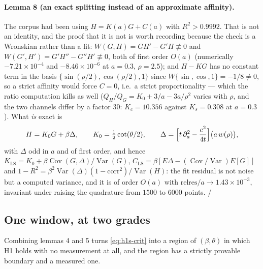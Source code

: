 \paragraph{Lemma 8 (an exact splitting instead of an approximate affinity).} The corpus had been
using $H=K(a)G+C(a)$ with $R^{2}>0.9992$. That is not an identity, and the proof that it is not is
worth recording because the check is a Wronskian rather than a fit: $W(G,H)=GH'-G'H\not\equiv0$ and
$W(G',H')=G'H''-G''H'\not\equiv0$, both of first order $O(a)$ (numerically $-7.21\times10^{-4}$ and
$-8.46\times10^{-6}$ at $a=0.3$, $\rho=2.5$); and $H-KG$ has no constant term in the basis
$\{\sin(\rho/2),\cos(\rho/2),1\}$ since $W\{\sin,\cos,1\}=-1/8\neq0$, so a strict affinity would force
$C=0$, i.e.\ a strict proportionality --- which the ratio computation kills as well
($Q_{H}/Q_{G}=K_{0}+3/a-3a/\rho^{2}$ varies with $\rho$, and the two channels differ by a factor
$30$: $K_{c}=10.356$ against $K_{s}=0.308$ at $a=0.3$). What \emph{is} exact is
\begin{equation}
H=K_{0}G+\beta\Delta,\qquad K_{0}=\tfrac12\cot(\theta/2),\qquad
\Delta=\Bigl[t\,\partial_{a}^{2}-\frac{c^{2}}{4t}\Bigr]\bigl(a\,w(\rho)\bigr),
\label{eq:h1s-affine}
\end{equation}
with $\Delta$ odd in $a$ and of first order, and hence $K_{\mathrm{LS}}=K_{0}+\beta\operatorname{Cov}(G,\Delta)/
\operatorname{Var}(G)$, $C_{\mathrm{LS}}=\beta[E\Delta-(\operatorname{Cov}/\operatorname{Var})E[G]]$ and
$1-R^{2}=\beta^{2}\operatorname{Var}(\Delta)(1-\mathrm{corr}^{2})/\operatorname{Var}(H)$: the fit
residual is not noise but a computed variance, and it is of order $O(a)$ with
$\mathrm{relres}/a\to1.43\times10^{-3}$, invariant under raising the quadrature from $1500$ to $6000$
points. \LT{}/~\LE


\subsection{One window, at two grades}
\label{sec:h1s-window}

Combining lemmas 4 and 5 turns \eqref{eq:h1s-crit} into a region of $(\beta,\theta)$ in which H1
holds with no measurement at all, and the region has a strictly provable boundary and a measured one.

